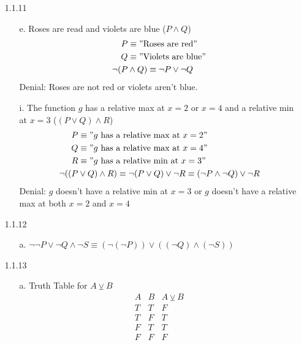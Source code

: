\documentclass[11pt]{amsart}
\theoremstyle{definition}
\newcommand*{\lxor}{\veebar}
\begin{document}
\begin{itemize}
\begin{itemize}
\end{itemize}

\item[1.1.11]
\begin{itemize}

    \item[e.]
    Roses are read and violets are blue ($P \land Q$)
    \begin{align*}
        P &\equiv "\text{Roses are red}" \\
        Q &\equiv "\text{Violets are blue}" \\
        \neg(P &\land Q) \equiv \neg P \lor \neg Q
    \end{align*}
    Denial: Roses are not red or violets aren't blue.

    \item[i.]
    The function $g$ has a relative max at $x=2$ or $x=4$ and a relative min at $x=3$ ($(P \lor Q) \land R$)
    \begin{align*}
        P &\equiv "g\text{ has a relative max at }x=2" \\
        Q &\equiv "g\text{ has a relative max at }x=4" \\
        R &\equiv "g\text{ has a relative min at }x=3" \\
        \neg((P &\lor Q) \land R) \equiv \neg(P \lor Q) \lor \neg R \equiv (\neg P \land \neg Q) \lor \neg R
    \end{align*}
    Denial: $g$ doesn't have a relative min at $x=3$ or $g$ doesn't have a relative max at both $x=2$ and $x=4$
    
\end{itemize}

\item[1.1.12]
\begin{itemize}

    \item[a.]
    $\neg\neg P\lor \neg Q \land \neg S
    \equiv
    (\neg (\neg P))\lor ( (\neg Q) \land (\neg S) )$
    
\end{itemize}

\item[1.1.13]
\begin{itemize}

    \item[a.]
    Truth Table for $A \lxor B$
    \begin{equation*}
    \begin{array}{ccc}
        A & B  & A \lxor B \\
        T & T & F \\
        T & F & T \\
        F & T & T \\
        F & F & F
    \end{array}
    \end{equation*}
    

\end{itemize}
\end{itemize}
\end{document}
